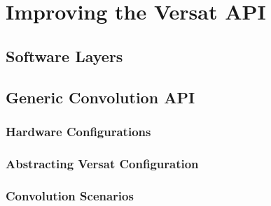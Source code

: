 \chapter{Improving the Versat API}
\label{chapter:API}



\section{Software Layers}




\section{Generic Convolution API}



\subsection{Hardware Configurations}

\subsection{Abstracting Versat Configuration}

\subsection{Convolution Scenarios}




